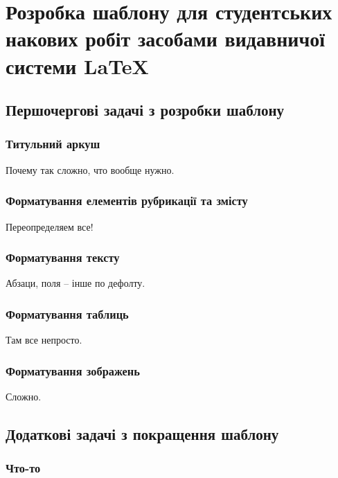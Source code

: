 \chapter{Розробка шаблону для студентських накових робіт засобами видавничої системи \LaTeX{}} \label{chap:second}
%
%
%
%
%
\section{Першочергові задачі з розробки шаблону}
%
%
\subsection{Титульний аркуш}
Почему так сложно, что вообще нужно.
%
%
\subsection{Форматування елементів рубрикації та змісту}
Переопределяем все!
%
%
\subsection{Форматування тексту}
Абзаци, поля -- інше по дефолту.
%
%
\subsection{Форматування таблиць}
Там все непросто.
%
%
\subsection{Форматування зображень}
Сложно.
%
%
%
%
%
\section{Додаткові задачі з покращення шаблону}
%
%
\subsection{Что-то}



